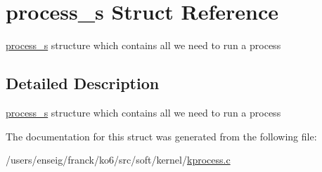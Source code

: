 \hypertarget{structprocess__s}{\section{process\-\_\-s Struct Reference}
\label{structprocess__s}
}


\hyperlink{structprocess__s}{process\-\_\-s} structure which contains all we need to run a process  




\subsection{Detailed Description}
\hyperlink{structprocess__s}{process\-\_\-s} structure which contains all we need to run a process 

The documentation for this struct was generated from the following file\-:\begin{DoxyCompactItemize}
\item 
/users/enseig/franck/ko6/src/soft/kernel/\hyperlink{kprocess_8c}{kprocess.\-c}\end{DoxyCompactItemize}
